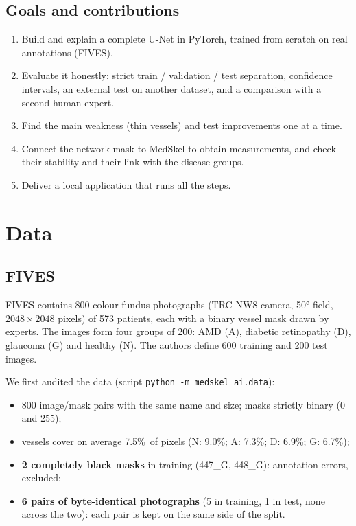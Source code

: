 \documentclass[11pt,a4paper]{article}
\newcommand{\pct}{\%}
\begin{document}
\subsection{Goals and contributions}
\begin{enumerate}
  \item Build and explain a complete U-Net in PyTorch, trained from scratch on real annotations (FIVES).
  \item Evaluate it honestly: strict train / validation / test separation, confidence intervals, an external test on another dataset, and a comparison with a second human expert.
  \item Find the main weakness (thin vessels) and test improvements one at a time.
  \item Connect the network mask to MedSkel to obtain measurements, and check their stability and their link with the disease groups.
  \item Deliver a local application that runs all the steps.
\end{enumerate}

\section{Data}

\subsection{FIVES}
FIVES \cite{fives} contains 800 colour fundus photographs (TRC-NW8 camera, 50° field, $2048\times2048$ pixels) of 573 patients, each with a binary vessel mask drawn by experts. The images form four groups of 200: AMD (A), diabetic retinopathy (D), glaucoma (G) and healthy (N). The authors define 600 training and 200 test images.

We first audited the data (script \texttt{python -m medskel\_ai.data}):
\begin{itemize}
  \item 800 image/mask pairs with the same name and size; masks strictly binary (0 and 255);
  \item vessels cover on average 7.5\pct\ of pixels (N: 9.0\pct; A: 7.3\pct; D: 6.9\pct; G: 6.7\pct);
  \item \textbf{2 completely black masks} in training (447\_G, 448\_G): annotation errors, excluded;
  \item \textbf{6 pairs of byte-identical photographs} (5 in training, 1 in test, none across the two): each pair is kept on the same side of the split.
\end{itemize}
\end{document}
